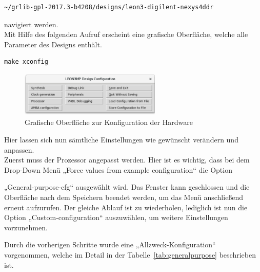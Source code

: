 \begin{lstlisting}[caption={Pfad zu dem passenden Design},label={code:pfaddesign}]
  ~/grlib-gpl-2017.3-b4208/designs/leon3-digilent-nexys4ddr
   \end{lstlisting}

navigiert werden.\\

Mit Hilfe des folgenden Aufruf erscheint eine grafische Oberfläche, welche alle Parameter des Designs enthält.\\
\begin{lstlisting}[caption={Aufruf des Konfigurationsmenüs},label={code:xconfig}]
make xconfig
   \end{lstlisting}




\begin{figure}[h!]
\centering
\includegraphics[width=0.6\textwidth]{Hauptteil/xconfig.png}
\caption{Grafische Oberfläche zur Konfiguration der Hardware}
\label{fig:xconfig}
\end{figure}

Hier lassen sich nun sämtliche Einstellungen wie gewünscht verändern und anpassen.\\

Zuerst muss der Prozessor angepasst werden. Hier ist es wichtig, dass bei dem Drop-Down Menü „Force values from example configuration“ die Option

„General-purpose-cfg“
ausgewählt wird. Das Fenster kann geschlossen und die Oberfläche nach dem Speichern beendet werden, um das Menü anschließend erneut aufzurufen.
Der gleiche Ablauf ist zu wiederholen, lediglich ist nun die Option
„Custom-configuration“ auszuwählen, um weitere Einstellungen vorzunehmen.

Durch die vorherigen Schritte wurde eine „Allzweck-Konfiguration“ vorgenommen, welche im Detail in der Tabelle~\ref{tab:generalpurpose} beschrieben ist.\\



